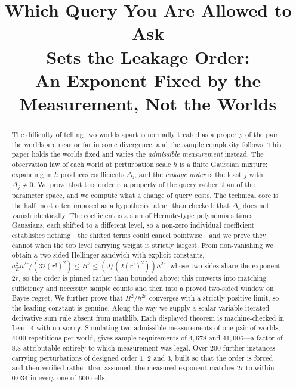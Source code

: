 



\title{Which Query You Are Allowed to Ask\\
Sets the Leakage Order:\\
An Exponent Fixed by the Measurement, Not the Worlds}

\author{
}

\maketitle

\begin{abstract}
The difficulty of telling two worlds apart is normally treated as a property of the pair:
the worlds are near or far in some divergence, and the sample complexity follows. This
paper holds the worlds fixed and varies the \emph{admissible measurement} instead. The
observation law of each world at perturbation scale $h$ is a finite Gaussian mixture;
expanding in $h$ produces coefficients $\Delta_{j}$, and the \emph{leakage order} is the
least $j$ with $\Delta_{j}\not\equiv0$. We prove that this order is a property of the query
rather than of the parameter space, and we compute what a change of query costs. The
technical core is the half most often imposed as a hypothesis rather than checked: that
$\Delta_{r}$ does not vanish
identically. The coefficient is a sum of Hermite-type polynomials times Gaussians, each
shifted to a different level, so a non-zero individual coefficient establishes nothing---the
shifted terms could cancel pointwise---and we prove they cannot when the top level carrying
weight is strictly largest. From non-vanishing we obtain a two-sided Hellinger sandwich with
explicit constants, $a_{E}^{2}h^{2r}/(32(r!)^{2})\le H^{2}\le(J/(2(r!)^{2}))h^{2r}$, whose two sides share the
exponent $2r$, so the order is pinned rather than bounded above; this converts into matching
sufficiency and necessity sample counts and then into a proved two-sided window on Bayes
regret. We further prove that $H^{2}/h^{2r}$ converges with a strictly positive limit, so
the leading constant is genuine. Along the way we supply a scalar-variable
iterated-derivative sum rule absent from mathlib. Each displayed theorem is machine-checked
in Lean~4 with no \texttt{sorry}. Simulating two admissible measurements of one pair of
worlds, $4000$ repetitions per world, gives sample requirements of $4{,}678$ and
$41{,}006$---a factor of $8.8$ attributable entirely to which measurement was legal. Over
$200$ further instances carrying perturbations of designed order $1$, $2$ and $3$, built so
that the order is forced and then verified rather than assumed, the measured exponent matches
$2r$ to within $0.034$ in every one of $600$ cells.
\end{abstract}

